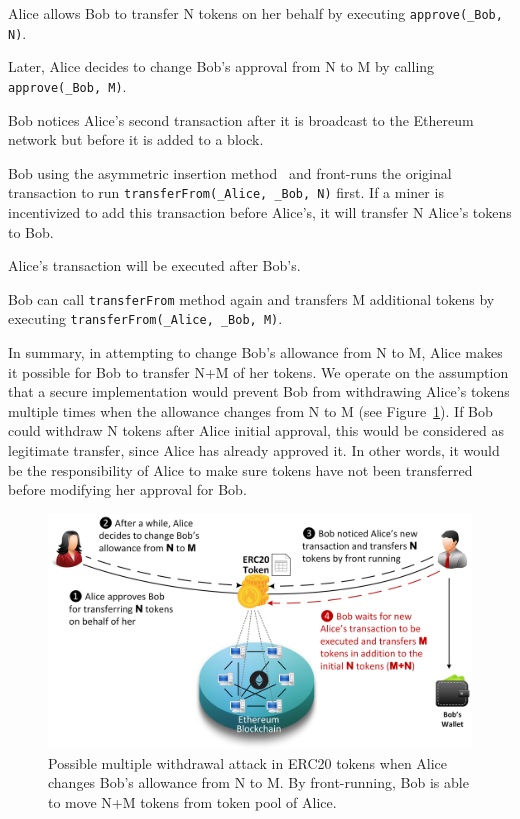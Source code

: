 \begin{compactlistn}
	\item Alice allows Bob to transfer N tokens on her behalf by executing \texttt{approve(\_Bob, N)}.
	\item Later, Alice decides to change Bob's approval from N to M by calling \texttt{approve(\_Bob, M)}.
	\item Bob notices Alice's second transaction after it is broadcast to the Ethereum network but before it is added to a block.
	\item Bob using the asymmetric insertion method~\cite{eskandari2019sok} and front-runs the original transaction to run  \texttt{transferFrom(\_Alice, \_Bob, N)} first. If a miner is incentivized to add this transaction before Alice's, it will transfer N Alice's tokens to Bob.
	\item Alice's transaction will be executed after Bob's.
	\item Bob can call \texttt{transferFrom} method again and transfers M additional tokens by executing \texttt{transferFrom(\_Alice, \_Bob, M)}.
\end{compactlistn}
In summary, in attempting to change Bob's allowance from N to M, Alice makes it possible for Bob to transfer N+M of her tokens. We operate on the assumption that a secure implementation would prevent Bob from withdrawing Alice's tokens multiple times when the allowance changes from N to M (see Figure~\ref{fig:mwa}). If Bob could withdraw N tokens after Alice initial approval, this would be considered as legitimate transfer, since Alice has already approved it. In other words, it would be the responsibility of Alice to make sure tokens have not been transferred before modifying her approval for Bob.
\begin{figure}[t!]
	\centering
	\includegraphics[width=1.0\linewidth]{figures/multiple_withdrawal_02.png}
	\caption{Possible multiple withdrawal attack in ERC20 tokens when Alice changes Bob's allowance from N to M. By front-running, Bob is able to move N+M tokens from token pool of Alice.\label{fig:mwa}}
\end{figure}

